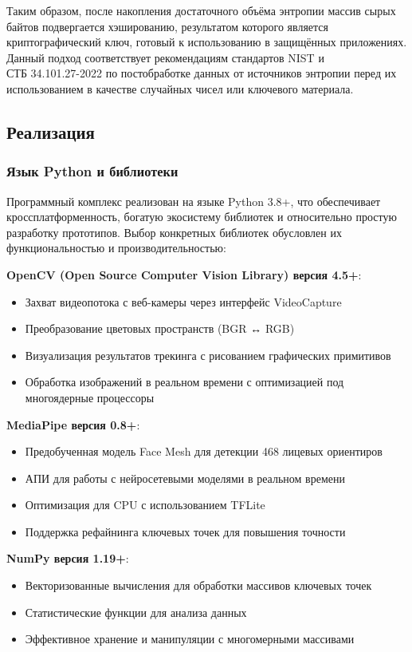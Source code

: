 \documentclass[14pt, a4paper]{extreport}
\begin{document}
Таким образом, после накопления достаточного объёма энтропии массив сырых байтов подвергается хэшированию, результатом которого является криптографический ключ, готовый к использованию в защищённых приложениях. Данный подход соответствует рекомендациям стандартов NIST и \\ СТБ 34.101.27-2022 по постобработке данных от источников энтропии перед их использованием в качестве случайных чисел или ключевого материала.

\subsection{Реализация}

\subsubsection{Язык Python и библиотеки}

Программный комплекс реализован на языке Python 3.8+, что обеспечивает кроссплатформенность, богатую экосистему библиотек и относительно простую разработку прототипов. Выбор конкретных библиотек обусловлен их функциональностью и производительностью:

\textbf{OpenCV (Open Source Computer Vision Library) версия 4.5+}: 
\begin{itemize}
    \item Захват видеопотока с веб-камеры через интерфейс VideoCapture
    \item Преобразование цветовых пространств (BGR ↔ RGB)
    \item Визуализация результатов трекинга с рисованием графических примитивов
    \item Обработка изображений в реальном времени с оптимизацией под многоядерные процессоры
\end{itemize}

\textbf{MediaPipe версия 0.8+}: 
\begin{itemize}
    \item Предобученная модель Face Mesh для детекции 468 лицевых ориентиров
    \item АПИ для работы с нейросетевыми моделями в реальном времени
    \item Оптимизация для CPU с использованием TFLite
    \item Поддержка рефайнинга ключевых точек для повышения точности
\end{itemize}

\textbf{NumPy версия 1.19+}: 
\begin{itemize}
    \item Векторизованные вычисления для обработки массивов ключевых точек
    \item Статистические функции для анализа данных
    \item Эффективное хранение и манипуляции с многомерными массивами
\end{itemize}
\end{document}
